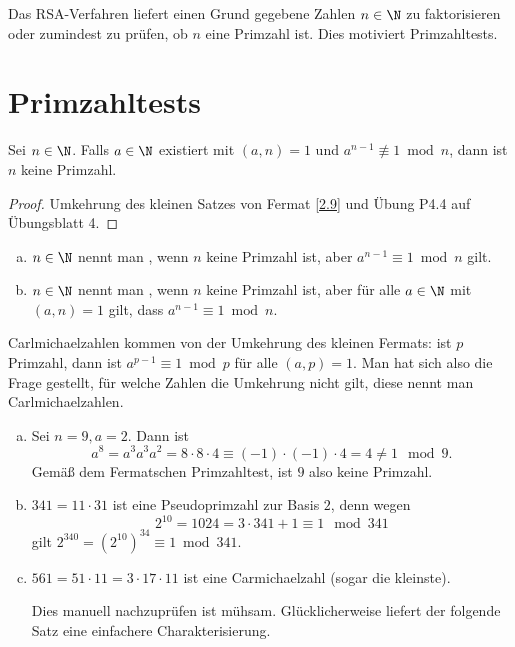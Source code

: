 Das RSA-Verfahren liefert einen Grund gegebene Zahlen $n \in \N$ zu faktorisieren oder zumindest zu prüfen, ob $n$ eine Primzahl ist.
Dies motiviert Primzahltests.

\section{Primzahltests}

\begin{prop} \label{3.5}
	Sei $n \in \N$.
	Falls $a \in \N$ existiert mit $(a,n) = 1$ und $a^{n-1} \not\equiv 1 \bmod n$, dann ist $n$ keine Primzahl.
	\begin{proof}
		Umkehrung des kleinen Satzes von Fermat \ref{2.9} und Übung P4.4 auf Übungsblatt 4.
	\end{proof}
\end{prop}

\begin{df} \label{3.6}
	\begin{enumerate}[a)]
		\item
			$n \in \N$ nennt man , wenn $n$ keine Primzahl ist, aber $a^{n-1} \equiv 1 \bmod n$ gilt.
		\item
			$n \in \N$ nennt man , wenn $n$ keine Primzahl ist, aber für alle $a \in \N$ mit $(a,n) = 1$ gilt, dass $a^{n-1} \equiv 1 \bmod n$.
	\end{enumerate}
	\begin{note}
		Carlmichaelzahlen  kommen von der Umkehrung des kleinen Fermats: ist $p$ Primzahl, dann ist $a^{p-1} \equiv 1 \bmod p$ für alle $(a,p) = 1$.
		Man hat sich also die Frage gestellt, für welche Zahlen die Umkehrung nicht gilt, diese nennt man Carlmichaelzahlen.
	\end{note}
\end{df}

\begin{ex} \label{3.7}
	\begin{enumerate}[a)]
		\item
			Sei $n = 9, a = 2$.
			Dann ist
			\[
				a^8
				= a^3 a^3 a^2
				= 8 \cdot 8 \cdot 4
				\equiv (-1) \cdot (-1) \cdot 4
				= 4
				\neq 1
				\mod 9.
			\]
			Gemäß dem Fermatschen Primzahltest, ist $9$ also keine Primzahl.
		\item
			$341 = 11 \cdot 31$ ist eine Pseudoprimzahl zur Basis $2$, denn wegen
			\[
				2^{10} = 1024 = 3\cdot 341 + 1
				\equiv 1 \mod 341
			\]
			gilt $2^{340} = (2^{10})^{34} \equiv 1 \bmod 341$.
		\item
			$561 = 51 \cdot 11 = 3 \cdot 17 \cdot 11$ ist eine Carmichaelzahl (sogar die kleinste).

			Dies manuell nachzuprüfen ist mühsam.
			Glücklicherweise liefert der folgende Satz eine einfachere Charakterisierung.
	\end{enumerate}
\end{ex}

